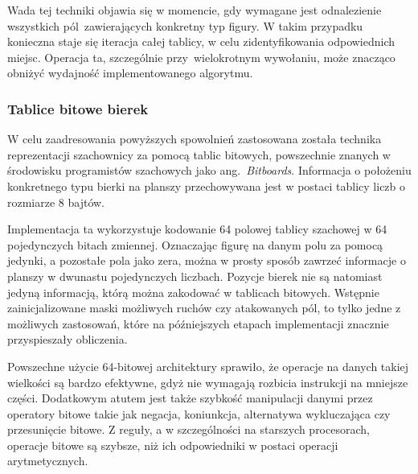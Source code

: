 Wada tej techniki objawia się w momencie, gdy wymagane jest odnalezienie wszystkich pól~zawierających konkretny typ figury.
W takim przypadku konieczna staje się iteracja całej tablicy, w celu zidentyfikowania odpowiednich miejsc.
Operacja ta, szczególnie przy~wielokrotnym wywołaniu, może znacząco obniżyć wydajność implementowanego algorytmu.

%
%
%
%


\subsubsection{Tablice bitowe bierek}

W celu zaadresowania powyższych spowolnień zastosowana została technika reprezentacji szachownicy za pomocą tablic bitowych, powszechnie znanych w środowisku programistów szachowych jako ang.~\emph{Bitboards}.
Informacja o położeniu konkretnego typu bierki na planszy przechowywana jest w postaci tablicy liczb o rozmiarze 8 bajtów.

Implementacja ta wykorzystuje kodowanie 64 polowej tablicy szachowej w 64 pojedynczych bitach zmiennej.
Oznaczając figurę na danym polu za pomocą jedynki, a pozostałe pola jako zera, można w prosty sposób zawrzeć informacje o planszy w dwunastu pojedynczych liczbach.
Pozycje bierek nie są natomiast jedyną informacją, którą można zakodować w tablicach bitowych.
Wstępnie zainicjalizowane maski możliwych ruchów czy atakowanych pól, to tylko jedne z możliwych zastosowań, które na późniejszych etapach implementacji znacznie przyspieszały obliczenia.

Powszechne użycie 64-bitowej architektury sprawiło, że operacje na danych takiej wielkości są bardzo efektywne, gdyż nie wymagają rozbicia instrukcji na mniejsze części.
Dodatkowym atutem jest także szybkość manipulacji danymi przez operatory bitowe takie jak negacja, koniunkcja, alternatywa wykluczająca czy przesunięcie bitowe.
Z reguły, a w szczególności na starszych procesorach, operacje bitowe są szybsze, niż ich odpowiedniki w postaci operacji arytmetycznych.

%

